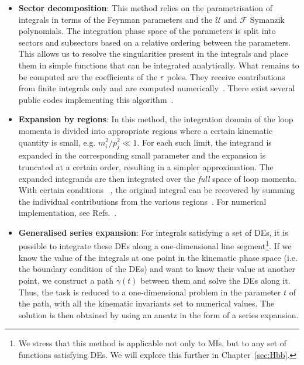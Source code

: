 \documentclass[main.tex]{subfiles}
\begin{document}
\begin{itemize}
    \item \textbf{Sector decomposition}: This method relies on the parametrisation of integrals in terms of the Feynman parameters and the $\mathcal{U}$ and $\mathcal{F}$ Symanzik polynomials. The integration phase space of the parameters is split into sectors and subsectors based on a relative ordering between the parameters. This allows us to resolve the singularities present in the integrals and place them in simple functions that can be integrated analytically. What remains to be computed are the coefficients of the $\epsilon$ poles. They receive contributions from finite integrals only and are computed numerically~\cite{Binoth:2000ps, Binoth:2003ak}. There exist several public codes implementing this algorithm~\cite{Bogner:2007cr, Smirnov:2015mct, Borowka:2015mxa, Heinrich:2023til}.
    \item \textbf{Expansion by regions}: In this method, the integration domain of the loop momenta is divided into appropriate regions where a certain kinematic quantity is small, e.g. $m_i^2/p_j^2 \ll 1$. For each such limit, the integrand is expanded in the corresponding small parameter and the expansion is truncated at a certain order, resulting in a simpler approximation. The expanded integrands are then integrated over the \textit{full} space of loop momenta. With certain conditions ~\cite{Jantzen:2011nz}, the original integral can be recovered by summing the individual contributions from the various regions~\cite{Beneke:1997zp, Smirnov:1998vk, Smirnov:1999bza, Pak:2010pt, Ananthanarayan:2018tog}. For numerical implementation, see Refs.~\cite{Ananthanarayan:2020ptw, Jantzen:2012mw, Smirnov:2015mct, Heinrich:2021dbf}. 
    \item \textbf{Generalised series expansion}: For integrals satisfying a set of DEs, it is possible to integrate these DEs along a one-dimensional line segment\footnote{We stress that this method is applicable not only to MIs, but to any set of functions satisfying DEs. We will explore this further in Chapter~\ref{sec:Hbb}.}. If we know the value of the integrals at one point in the kinematic phase space (i.e. the boundary condition of the DEs) and want to know their value at another point, we construct a path $\gamma(t)$ between them and solve the DEs along it. Thus, the task is reduced to a one-dimensional problem in the parameter $t$ of the path, with all the kinematic invariants set to numerical values. The solution is then obtained by using an ansatz in the form of a series expansion. 


\end{itemize}
\end{document}
